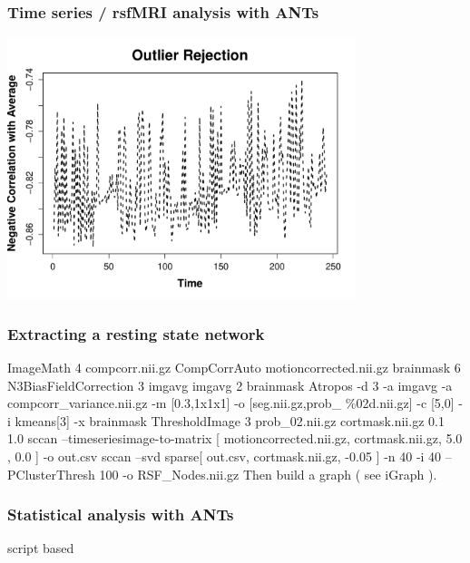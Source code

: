 \documentclass[18pt]{beamer}
\begin{document}
\begin{frame}
\frametitle{Time series / rsfMRI analysis with ANTs}
\includegraphics[width=4in]{../figures/rsfmriplot2.pdf}
\end{frame}

\begin{frame}
\frametitle{Extracting a resting state network}
   ImageMath 4 compcorr.nii.gz CompCorrAuto motioncorrected.nii.gz   brainmask 6
   \newline
   \newline
   N3BiasFieldCorrection 3 imgavg imgavg 2 brainmask 
   \newline
   \newline
  Atropos -d 3 -a imgavg -a compcorr\_variance.nii.gz -m  [0.3,1x1x1] -o [seg.nii.gz,prob\_ \%02d.nii.gz] -c [5,0] -i kmeans[3] -x brainmask 
   \newline
   \newline
   ThresholdImage 3 prob\_02.nii.gz cortmask.nii.gz 0.1 1.0
     \newline
   \newline
   sccan  --timeseriesimage-to-matrix [ motioncorrected.nii.gz,
   cortmask.nii.gz, 5.0 , 0.0 ] -o out.csv 
   \newline
   \newline
   sccan  --svd sparse[ out.csv, cortmask.nii.gz, -0.05 ] -n 40 -i 40  --PClusterThresh 100  -o RSF\_Nodes.nii.gz
   \newline
   \newline
   Then build a graph ( see iGraph ).
\end{frame}


\begin{frame}
\frametitle{Statistical analysis with ANTs}
script based 
\end{frame}
\end{document}
